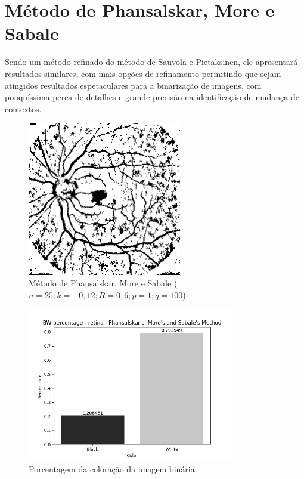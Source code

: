 \documentclass[12pt, letterpaper]{article}
\begin{document}
\section{Método de Phansalskar, More e Sabale}
    Sendo um método refinado do método de Sauvola e Pietaksinen, ele apresentará resultados similares, com mais opções de refinamento permitindo que sejam atingidos resultados espetaculares para a binarização de imagens, com pouquíssima perca de detalhes e grande precisão na identificação de mudança de contextos.
    \begin{figure}[H]
        \centering
        \includegraphics[width=0.6\textwidth]{phansalskar_retina.png}
        \\{Método de Phansalskar, More e Sabale ($n = 25; k = -0,12; R = 0,6; p = 1; q = 100$)}
    \end{figure}
    \begin{figure}[H]
        \centering
        \includegraphics[width=0.8\textwidth]{phansalskar_retina_bw_percentage.png}
        \\{Porcentagem da coloração da imagem binária}
    \end{figure}
\end{document}
